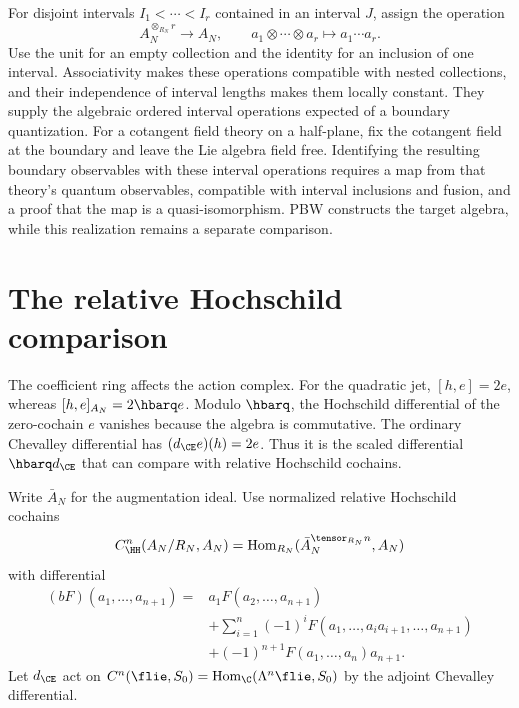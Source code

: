 For disjoint intervals $I_1<\cdots<I_r$ contained in an interval $J$,
assign the operation
\[
 A_N^{\otimes_{R_N}r}\longrightarrow A_N,
 \qquad a_1\otimes\cdots\otimes a_r\longmapsto a_1\cdots a_r.
\]
Use the unit for an empty collection and the identity for an inclusion
of one interval. Associativity makes these operations compatible with
nested collections, and their independence of interval lengths makes
them locally constant. They supply the algebraic ordered interval
operations expected of a boundary quantization.
For a cotangent field theory on a half-plane, fix the cotangent field
at the boundary and leave the Lie algebra field free. Identifying the
resulting boundary observables with these interval operations requires
a map from that theory's quantum
observables, compatible with interval inclusions and fusion, and a
proof that the map is a quasi-isomorphism. PBW constructs the target
algebra, while this realization remains a separate comparison.

\section{The relative Hochschild comparison}

The coefficient ring affects the action complex. For the quadratic
jet, $[h,e]=2e$, whereas $[h,e]_{A_N}=2\hbarq e$.
Modulo $\hbarq$, the Hochschild differential of the zero-cochain $e$
vanishes because the algebra is commutative. The ordinary Chevalley
differential has $(d_{\CE}e)(h)=2e$. Thus it is the scaled differential
$\hbarq d_{\CE}$ that can compare with relative Hochschild cochains.

Write $\bar A_N$ for the augmentation ideal.
Use normalized relative Hochschild cochains
\[
 C^n_{\HH}(A_N/R_N,A_N)
 =\operatorname{Hom}_{R_N}(\bar A_N^{\tensor_{R_N}n},A_N)
\]
with differential
\[
\begin{split}
 (bF)(a_1,\ldots,a_{n+1})
 ={}&a_1F(a_2,\ldots,a_{n+1})\\
 &+\sum_{i=1}^n(-1)^iF(a_1,\ldots,a_i a_{i+1},\ldots,a_{n+1})\\
 &+(-1)^{n+1}F(a_1,\ldots,a_n)a_{n+1}.
\end{split}
\]
Let $d_{\CE}$ act on
$C^n(\flie,S_0)=\operatorname{Hom}_\C(\Lambda^n\flie,S_0)$
by the adjoint Chevalley differential.

